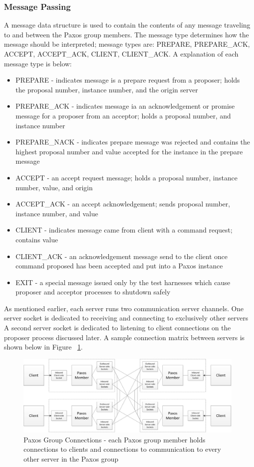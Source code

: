 \documentclass{article}
\begin{document}
\subsubsection{Message Passing}

A message data structure is used to contain the contents of any message traveling to and between the Paxos group members.
The message type determines how the message should be interpreted; message types are: PREPARE, PREPARE\_ACK, ACCEPT, ACCEPT\_ACK, CLIENT, CLIENT\_ACK.
A explanation of each message type is below:
\begin{itemize}
\item PREPARE - indicates message is a prepare request from a proposer; holds the proposal number, instance number, and the origin server
\item PREPARE\_ACK - indicates message ia an acknowledgement or promise message for a proposer from an acceptor; holds a proposal number, and instance number
\item PREPARE\_NACK - indicates prepare message was rejected and contains the highest proposal number and value accepted for the instance in the prepare message
\item ACCEPT - an accept request message; holds a proposal number, instance number, value, and origin
\item ACCEPT\_ACK - an accept acknowledgement; sends proposal number, instance number, and value
\item CLIENT - indicates message came from client with a command request; contains value
\item CLIENT\_ACK - an acknowledgement message send to the client once command proposed has been accepted and put into a Paxos instance
\item EXIT - a special message issued only by the test harnesses which cause proposer and acceptor processes to shutdown safely
\end{itemize}

As mentioned earlier, each server runs two communication server channels.
One server socket is dedicated to receiving and connecting to exclusively other servers
A second server socket is dedicated to listening to client connections on the proposer process discussed later.
A sample connection matrix between servers is shown below in Figure ~\ref{connection_matrix}.

\begin{figure}
\centering
\includegraphics[width=6in]{paxos_group_connections.jpg}
\caption{Paxos Group Connections - each Paxos group member holds connections to clients and connections to communication to every other server in the Paxos group} 
\label{connection_matrix}
\end{figure}
\end{document}
